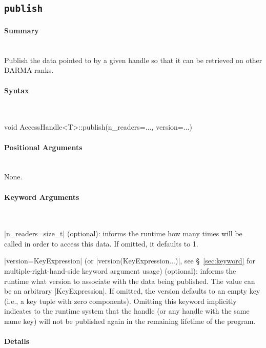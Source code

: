 \subsection{\texttt{publish}}
\label{ssec:api_fe_publish}

\paragraph{Summary} \mbox{}\\
Publish the data pointed to by a given handle so that it can be retrieved on 
other DARMA ranks.

\paragraph{Syntax} \mbox{}\\
\begin{CppCode}
void
AccessHandle<T>::publish(n_readers=..., version=...)
\end{CppCode}

\paragraph{Positional Arguments} \mbox{}\\
None.

\paragraph{Keyword Arguments} \mbox{}\\
\begin{compactitem}
\item |n_readers=size_t| (optional): informs the runtime how many times
 will be called in order to access this data.
If omitted, it defaults to 1.
\item |version=KeyExpression| (or |version(KeyExpression...)|,
see \S~\ref{sec:keyword} for multiple-right-hand-side keyword argument usage)
(optional):
informs the runtime what version to associate with the data being published. 
The value can be an arbitrary |KeyExpression|.
If omitted, the version defaults to an empty key (i.e., a key tuple with zero 
components).  Omitting this keyword implicitly indicates to the runtime system
that the handle (or any handle with the same name key) will not be published
again in the remaining lifetime of the program.
\end{compactitem}

\paragraph{Details} \mbox{}\\

